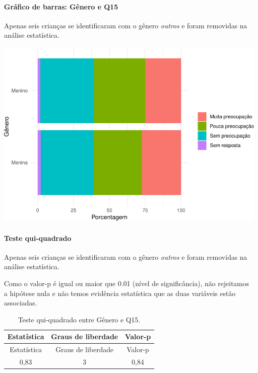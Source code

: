 \documentclass[]{article}
\let\oldparagraph\paragraph
\renewcommand{\paragraph}[1]{\oldparagraph{#1}\mbox{}}
\begin{document}
\hypertarget{gruxe1fico-de-barras-guxeanero-e-q15}{%
\paragraph{Gráfico de barras: Gênero e Q15}\label{gruxe1fico-de-barras-guxeanero-e-q15}}

Apenas seis crianças se identificaram com o gênero \emph{outros} e foram removidas na análise estatística.

\begin{center}\includegraphics[width=0.75\linewidth]{relatorio_covid19_files/figure-latex/unnamed-chunk-82-1} \end{center}

\hypertarget{teste-qui-quadrado-8}{%
\paragraph{Teste qui-quadrado}\label{teste-qui-quadrado-8}}

Apenas seis crianças se identificaram com o gênero \emph{outros} e foram removidas na análise estatística.

Como o valor-p é igual ou maior que 0.01 (nível de significância), não rejeitamos a hipótese nula e não temos evidência estatística que as duas variáveis estão associadas.

\begin{longtable}[]{@{}ccc@{}}
\caption{\label{tab:unnamed-chunk-84}Teste qui-quadrado entre Gênero e Q15.}\tabularnewline
\toprule
Estatística & Graus de liberdade & Valor-p\tabularnewline
\midrule
\endfirsthead
\toprule
Estatística & Graus de liberdade & Valor-p\tabularnewline
\midrule
\endhead
0,83 & 3 & 0,84\tabularnewline
\bottomrule
\end{longtable}

\cleardoublepage
\end{document}

